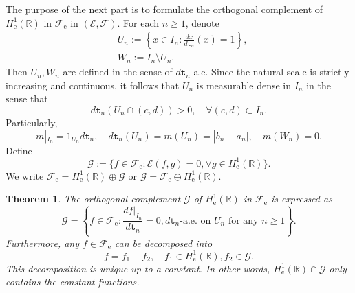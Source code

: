 \documentclass[a4paper]{amsart}
\newtheorem{theorem}{Theorem}[section]
\theoremstyle{definition}
\theoremstyle{remark}
\numberwithin{equation}{section}
\begin{document}
The purpose of the next part is to formulate the orthogonal complement of $H^1_\mathrm{e}(\mathbb{R})$ in ${{\mathcal{F}}}_\mathrm{e}$ in $({{\mathcal{E}}},{{\mathcal{F}}})$.
For each $n\geq 1$, denote
\begin{equation}\label{EQ3UNX}
\begin{aligned}
	&U_n:=\left\{x\in I_n: \frac{dx}{d{{\mathtt{t}}}_n}(x)=1\right\}, \\
	&W_n:=I_n\setminus U_n.
\end{aligned}\end{equation}
Then $U_n, W_n$ are defined in the sense of $d{{\mathtt{t}}}_n$-a.e. Since the natural scale is strictly increasing and continuous, it follows that $U_n$ is measurable dense in $I_n$ in the sense that
\[
	d{{\mathtt{t}}}_n(U_n\cap (c,d))>0,\quad \forall (c,d)\subset I_n.
\]
Particularly,
\[
	m|_{I_n}=1_{U_n}d{{\mathtt{t}}}_n,\quad d{{\mathtt{t}}}_n(U_n)=m(U_n)=|b_n-a_n|, \quad  m(W_n)=0.
\]
 Define
\begin{equation}\label{EQ3GFFE}
\mathcal{G}:=\{f\in {{\mathcal{F}}}_\mathrm{e}: {{\mathcal{E}}}(f,g)=0, \forall g\in H^1_\mathrm{e}(\mathbb{R})\}.
\end{equation}
We write ${{\mathcal{F}}}_\mathrm{e}=H^1_\mathrm{e}(\mathbb{R})\oplus \mathcal{G}$ or $\mathcal{G}={{\mathcal{F}}}_\mathrm{e}\ominus H^1_\mathrm{e}(\mathbb{R})$.

\begin{theorem}\label{THM32}
The orthogonal complement $\mathcal{G}$ of $H^1_\mathrm{e}(\mathbb{R})$ in ${{\mathcal{F}}}_\mathrm{e}$ is expressed as
\begin{equation}\label{EQ3GFF}
	\mathcal{G}=\left\{f\in {{\mathcal{F}}}_\mathrm{e}: \frac{df|_{I_n}}{d{{\mathtt{t}}}_n}=0, d{{\mathtt{t}}}_n\text{-a.e. on }U_n\text{ for any }n\geq 1\right\}.
\end{equation}
Furthermore, any $f\in {{\mathcal{F}}}_\mathrm{e}$ can be decomposed into
\begin{equation}\label{EQ3UUU}
	f=f_1+f_2,\quad f_1\in H^1_\mathrm{e}(\mathbb{R}), f_2\in \mathcal{G}.
\end{equation}
This decomposition is unique up to a constant. In other words, $H^1_\mathrm{e}(\mathbb{R})\cap \mathcal{G}$ only contains the constant functions.
\end{theorem}
\end{document}
